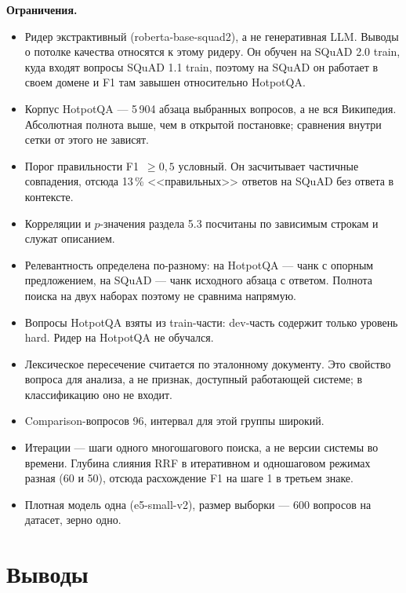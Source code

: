 \textbf{Ограничения.}
\begin{itemize}
\item Ридер экстрактивный (roberta-base-squad2), а не генеративная LLM. Выводы о потолке качества относятся к этому ридеру. Он обучен на SQuAD 2.0 train, куда входят вопросы SQuAD 1.1 train, поэтому на SQuAD он работает в своем домене и F1 там завышен относительно HotpotQA.
\item Корпус HotpotQA --- 5\,904 абзаца выбранных вопросов, а не вся Википедия. Абсолютная полнота выше, чем в открытой постановке; сравнения внутри сетки от этого не зависят.
\item Порог правильности F1~$\ge 0{,}5$ условный. Он засчитывает частичные совпадения, отсюда 13\,\% <<правильных>> ответов на SQuAD без ответа в контексте.
\item Корреляции и $p$-значения раздела 5.3 посчитаны по зависимым строкам и служат описанием.
\item Релевантность определена по-разному: на HotpotQA --- чанк с опорным предложением, на SQuAD --- чанк исходного абзаца с ответом. Полнота поиска на двух наборах поэтому не сравнима напрямую.
\item Вопросы HotpotQA взяты из train-части: dev-часть содержит только уровень hard. Ридер на HotpotQA не обучался.
\item Лексическое пересечение считается по эталонному документу. Это свойство вопроса для анализа, а не признак, доступный работающей системе; в классификацию оно не входит.
\item Comparison-вопросов 96, интервал для этой группы широкий.
\item Итерации --- шаги одного многошагового поиска, а не версии системы во времени. Глубина слияния RRF в итеративном и одношаговом режимах разная (60 и 50), отсюда расхождение F1 на шаге 1 в третьем знаке.
\item Плотная модель одна (e5-small-v2), размер выборки --- 600 вопросов на датасет, зерно одно.
\end{itemize}

\section{Выводы}

